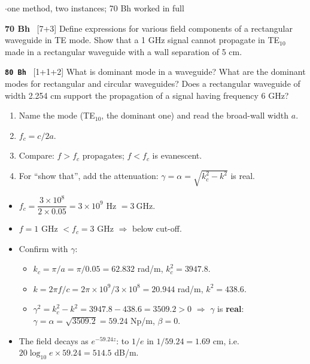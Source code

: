 \vspace{2pt}

{\color{sub}\footnotesize {} \gap$\cdot$\gap one method, two instances; 70 Bh worked in full}

\begin{asked}{\textbf{70 Bh} \ [7+3]}
Define expressions for various field components of a rectangular waveguide in TE mode. Show that a 1 GHz signal cannot propagate in TE$_{10}$ made in a rectangular waveguide with a wall separation of 5 cm.
\end{asked}
\begin{asked}{\textbf{\texttt{80 Bh}} \ [1+1+2]}
What is dominant mode in a waveguide? What are the dominant modes for rectangular and circular waveguides? Does a rectangular waveguide of width 2.254 cm support the propagation of a signal having frequency 6 GHz?
\end{asked}
\begin{enumerate}[label=\arabic*., leftmargin=1.4em, itemsep=0pt]
  \item Name the mode (TE$_{10}$, the dominant one) and read the broad-wall width $a$.
  \item $f_c = c/2a$.
  \item Compare: $f > f_c$ propagates; $f < f_c$ is evanescent.
  \item For ``show that'', add the attenuation: $\gamma = \alpha = \sqrt{k_c^2 - k^2}$ is real.
\end{enumerate}
\begin{itemize}
  \item $f_c = \dfrac{3\times10^8}{2\times0.05} = 3\times10^9$ Hz $= \boxed{3\ \text{GHz}}$.
  \item $f = 1$ GHz $< f_c = 3$ GHz $\Rightarrow$ below cut-off.
  \item Confirm with $\gamma$:
  \begin{itemize}
    \item $k_c = \pi/a = \pi/0.05 = 62.832$ rad/m, \quad $k_c^2 = 3947.8$.
    \item $k = 2\pi f/c = 2\pi\times10^9/3\times10^8 = 20.944$ rad/m, \quad $k^2 = 438.6$.
    \item $\gamma^2 = k_c^2 - k^2 = 3947.8 - 438.6 = 3509.2 > 0$ $\Rightarrow$ $\gamma$ is
      \textbf{real}: $\gamma = \alpha = \sqrt{3509.2} = 59.24$ Np/m, $\beta = 0$.
  \end{itemize}
  \item The field decays as $e^{-59.24z}$: to $1/e$ in $1/59.24 = 1.69$ cm, i.e.
    $20\log_{10}e \times 59.24 = 514.5$ dB/m. 
\end{itemize}
